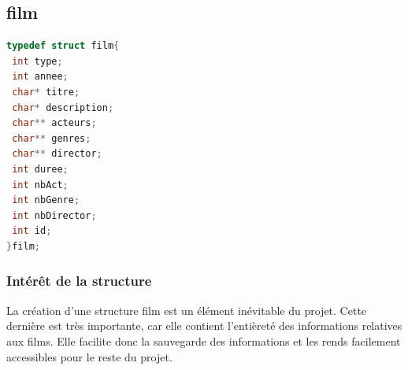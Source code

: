 \documentclass{article}
\begin{document}
\subsection{film}
    \begin{lstlisting}[language=C]
typedef struct film{
 int type;
 int annee;
 char* titre;
 char* description;
 char** acteurs;
 char** genres;
 char** director;
 int duree;
 int nbAct;
 int nbGenre;
 int nbDirector;
 int id;
}film;
    \end{lstlisting}
\subsubsection{Intérêt de la structure}
    La création d'une structure film est un élément inévitable du projet. Cette dernière est très importante, car elle contient l'entièreté des informations relatives aux films. Elle facilite donc la sauvegarde des informations et les rends facilement accessibles pour le reste du projet.
\end{document}

